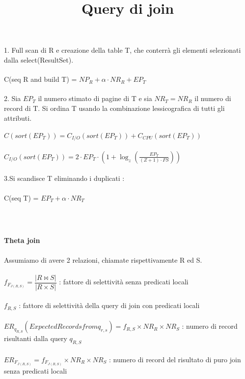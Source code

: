 \documentclass[a4paper,12pt]{article}
\begin{document}
\begin{titlepage}
\begin{titlepage}
		1. Full scan di R e creazione della table T, che conterrà gli elementi selezionati dalla select(ResultSet). \\ \\
		C(seq R and build T) = $ NP_{R} + \alpha \cdot NR_{R} + EP_{T}  $ \\ \\
		2. Sia $EP_{T}$ il numero stimato di pagine di T e sia $NR_{T} = NR_{R} $ il numero di record di T.
		Si ordina T usando la combinazione lessicografica di tutti gli attributi. \\  \\
		$C(sort(EP_{T})) = C_{I/O}(sort(EP_{T})) + C_{CPU}(sort(EP_{T}))$ \\ \\
		$C_{I/O}(sort(EP_{T})) =  2 \cdot EP_{T} \cdot (1 + \log_{z}(\tfrac{EP_{T}}{(Z + 1) \cdot FS})) $ \\ \\
		3.Si scandisce T eliminando i duplicati : \\ \\
		C(seq T) = $ EP_ {T} + \alpha \cdot NR_{T} $
		\end{titlepage}
		\begin{titlepage}
		\title{\huge \textbf{Query di join}} \\ \\ 
		\maketitle
		\textbf{ Theta join} \\ \\
		Assumiamo di avere 2 relazioni, chiamate rispettivamente R ed S. \\ \\
		$f _{F_{J(R,S)}} = \dfrac{| R \Join S |}{| R \times S |}$ : fattore di selettività senza predicati locali \\ \\
		$f_{R, S}$ : fattore di selettività della query di join con predicati locali  \\ \\
		$ER_{q_{R, S}}(Expected Records from q_{r,s}) = f_{R, S} \times NR_{R} \times NR_{S} $ : numero di record risultanti dalla query $q_{R,S}$ \\ \\
		$ER_{F_{J(R, S)}} = f _{F_{J(R,S)}} \times NR_{R} \times NR_{S}$ : numero di record del risultato di puro join senza predicati locali \\ \\

\end{titlepage}
\end{titlepage}
\end{document}
